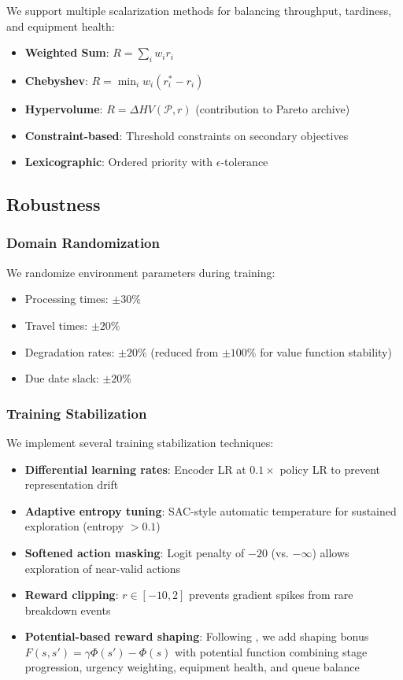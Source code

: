 \documentclass[11pt,a4paper]{article}
\begin{document}
We support multiple scalarization methods for balancing throughput, tardiness, and equipment health:

\begin{itemize}
    \item \textbf{Weighted Sum}: $R = \sum_i w_i r_i$
    \item \textbf{Chebyshev}: $R = \min_i w_i (r_i^* - r_i)$
    \item \textbf{Hypervolume}: $R = \Delta HV(\mathcal{P}, r)$ (contribution to Pareto archive)
    \item \textbf{Constraint-based}: Threshold constraints on secondary objectives
    \item \textbf{Lexicographic}: Ordered priority with $\epsilon$-tolerance
\end{itemize}

\subsection{Robustness}

\subsubsection{Domain Randomization}

We randomize environment parameters during training:
\begin{itemize}
    \item Processing times: $\pm 30\%$
    \item Travel times: $\pm 20\%$
    \item Degradation rates: $\pm 20\%$ (reduced from $\pm 100\%$ for value function stability)
    \item Due date slack: $\pm 20\%$
\end{itemize}

\subsubsection{Training Stabilization}

We implement several training stabilization techniques:
\begin{itemize}
    \item \textbf{Differential learning rates}: Encoder LR at $0.1\times$ policy LR to prevent representation drift
    \item \textbf{Adaptive entropy tuning}: SAC-style automatic temperature for sustained exploration (entropy $> 0.1$)
    \item \textbf{Softened action masking}: Logit penalty of $-20$ (vs. $-\infty$) allows exploration of near-valid actions
    \item \textbf{Reward clipping}: $r \in [-10, 2]$ prevents gradient spikes from rare breakdown events
    \item \textbf{Potential-based reward shaping}: Following \citet{ng1999policy}, we add shaping bonus $F(s, s') = \gamma \Phi(s') - \Phi(s)$ with potential function combining stage progression, urgency weighting, equipment health, and queue balance
\end{itemize}
\end{document}
